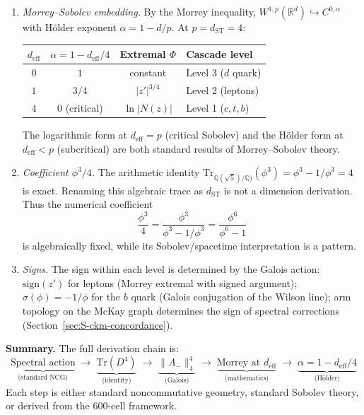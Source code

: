 \documentclass[12pt,a4paper]{article}
\theoremstyle{definition}
\begin{document}
\begin{enumerate}
\item[(D)] \emph{Morrey--Sobolev embedding.}  By the Morrey inequality, $W^{1,p}(\mathbb{R}^d) \hookrightarrow C^{0,\alpha}$ with H\"{o}lder exponent $\alpha = 1 - d/p$.  At $p = d_{\text{ST}} = 4$:
\begin{center}
\begin{tabular}{cccl}
\toprule
$d_{\text{eff}}$ & $\alpha = 1 - d_{\text{eff}}/4$ & Extremal $\Phi$ & Cascade level \\
\midrule
$0$ & $1$ & constant & Level 3 ($d$ quark) \\
$1$ & $3/4$ & $|z'|^{3/4}$ & Level 2 (leptons) \\
$4$ & $0$ (critical) & $\ln|N(z)|$ & Level 1 ($c,t,b$) \\
\bottomrule
\end{tabular}
\end{center}
The logarithmic form at $d_{\text{eff}} = p$ (critical Sobolev) and the H\"{o}lder form at $d_{\text{eff}} < p$ (subcritical) are both standard results of Morrey--Sobolev theory.

\item[(E)] \emph{Coefficient $\phi^3/4$.}  The arithmetic identity $\mathrm{Tr}_{\mathbb{Q}(\sqrt5)/\mathbb{Q})}(\phi^3)=\phi^3-1/\phi^3=4$ is exact.  Renaming this algebraic trace as $d_{\text{ST}}$ is not a dimension derivation.  Thus the numerical coefficient
\begin{equation}
\frac{\phi^3}{4} = \frac{\phi^3}{\phi^3 - 1/\phi^3} = \frac{\phi^6}{\phi^6 - 1}
\end{equation}
is algebraically fixed, while its Sobolev/spacetime interpretation is a pattern.

\item[(F)] \emph{Signs.}  The sign within each level is determined by the Galois action: $\mathrm{sign}(z')$ for leptons (Morrey extremal with signed argument); $\sigma(\phi) = -1/\phi$ for the $b$ quark (Galois conjugation of the Wilson line); arm topology on the McKay graph determines the sign of spectral corrections (Section~\ref{sec:S-ckm-concordance}).
\end{enumerate}

\textbf{Summary.}  The full derivation chain is:
\[
\underbrace{\text{Spectral action}}_{\text{(standard NCG)}} \;\to\; \underbrace{\mathrm{Tr}(D^4)}_{\text{(identity)}} \;\to\; \underbrace{\|A_-\|_4^4}_{\text{(Galois)}} \;\to\; \underbrace{\text{Morrey at } d_{\text{eff}}}_{\text{(mathematics)}} \;\to\; \underbrace{\alpha = 1 - d_{\text{eff}}/4}_{\text{(H\"{o}lder)}}
\]
Each step is either standard noncommutative geometry, standard Sobolev theory, or derived from the 600-cell framework.
\end{document}
